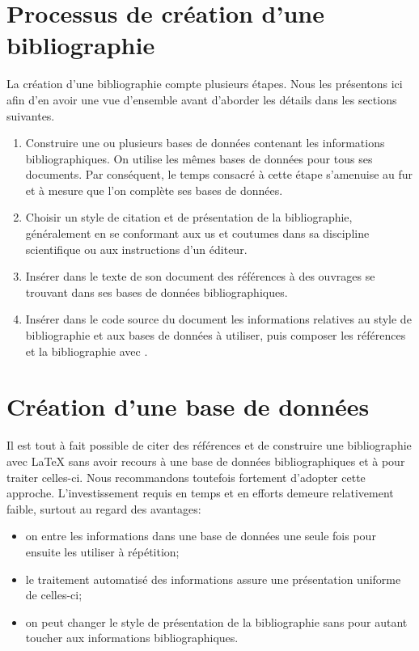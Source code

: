 \section{Processus de création d'une bibliographie}
\label{sec:bibliographie:processus}

La création d'une bibliographie compte plusieurs étapes. Nous les
présentons ici afin d'en avoir une vue d'ensemble avant d'aborder les
détails dans les sections suivantes.

\begin{enumerate}
\item Construire une ou plusieurs bases de données contenant les
  informations bibliographiques. On utilise les mêmes bases de données
  pour tous ses documents. Par conséquent, le temps consacré à cette
  étape s'amenuise au fur et à mesure que l'on complète ses bases de
  données.
\item Choisir un style de citation et de présentation de la
  bibliographie, généralement en se conformant aux us et coutumes dans
  sa discipline scientifique ou aux instructions d'un éditeur.
\item Insérer dans le texte de son document des références à des
  ouvrages se trouvant dans ses bases de données bibliographiques.
\item Insérer dans le code source du document les informations
  relatives au style de bibliographie et aux bases de données à
  utiliser, puis composer les références et la bibliographie avec
  {\BibTeX}.
\end{enumerate}


\section{Création d'une base de données}
\label{sec:bibliographie:bib}

Il est tout à fait possible de citer des références et de construire
une bibliographie avec {\LaTeX} sans avoir recours à une base de
données bibliographiques et à {\BibTeX} pour traiter celles-ci. Nous
recommandons toutefois fortement d'adopter cette approche.
L'investissement requis en temps et en efforts demeure relativement
faible, surtout au regard des avantages:
\begin{itemize}
\item on entre les informations dans une base de données une seule
  fois pour ensuite les utiliser à répétition;
\item le traitement automatisé des informations assure une
  présentation uniforme de celles-ci;
\item on peut changer le style de présentation de la bibliographie
  sans pour autant toucher aux informations bibliographiques.
\end{itemize}

